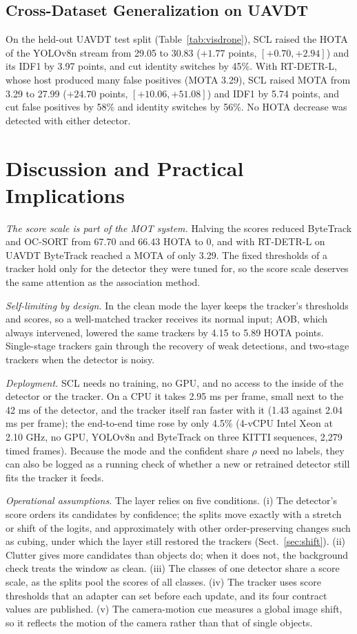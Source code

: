 \documentclass[pdflatex,sn-mathphys-num,iicol]{sn-jnl}
\newcommand{\scl}{SCL}
\newcommand{\aob}{AOB}
\begin{document}
\subsection{Cross-Dataset Generalization on UAVDT}\label{sec:visdrone}
On the held-out UAVDT test split (Table~\ref{tab:visdrone}), \scl{} raised the HOTA of the YOLOv8n
stream from 29.05 to 30.83 ($+1.77$ points, $[+0.70,+2.94]$) and its IDF1 by 3.97 points, and cut identity switches by
45\%. With RT-DETR-L, whose host produced many false positives (MOTA 3.29), \scl{} raised MOTA from 3.29
to 27.99 ($+24.70$ points, $[+10.06,+51.08]$) and IDF1 by 5.74 points, and cut false positives by 58\% and
identity switches by 56\%. No HOTA decrease was detected with either detector.
\section{Discussion and Practical Implications}\label{sec:discussion}

\emph{The score scale is part of the MOT system.} Halving the scores reduced ByteTrack and OC-SORT
from 67.70 and 66.43 HOTA to 0, and with RT-DETR-L on UAVDT ByteTrack reached a MOTA of only 3.29.
The fixed thresholds of a tracker hold only for the detector they were tuned for, so the score
scale deserves the same attention as the association method.

\emph{Self-limiting by design.} In the clean mode the layer keeps the tracker's thresholds and
scores, so a well-matched tracker receives its normal input; \aob{}, which always intervened,
lowered the same trackers by 4.15 to 5.89 HOTA points. Single-stage trackers gain through the
recovery of weak detections, and two-stage trackers when the detector is noisy.

\emph{Deployment.} \scl{} needs no training, no GPU, and no access to the inside of the detector or
the tracker. On a CPU it takes 2.95 ms per frame, small next to the 42 ms of the detector, and the
tracker itself ran faster with it (1.43 against 2.04 ms per frame); the end-to-end time rose by
only 4.5\% (4-vCPU Intel Xeon at 2.10 GHz, no GPU, YOLOv8n and ByteTrack on three KITTI sequences,
2,279 timed frames). Because the mode and the confident share
$\rho$ need no labels, they can also be logged as a running check of whether a new or retrained
detector still fits the tracker it feeds.

\emph{Operational assumptions.} The layer relies on five conditions. (i) The detector's score
orders its candidates by confidence; the splits move exactly with a stretch or shift of the
logits, and approximately with other order-preserving changes such as cubing, under which the
layer still restored the trackers (Sect.~\ref{sec:shift}). (ii) Clutter gives more candidates
than objects do; when it does not, the background check treats the window as clean. (iii) The
classes of one detector share a score scale, as the splits pool the scores of all classes. (iv)
The tracker uses score thresholds that an adapter can set before each update, and its four
contract values are published. (v) The camera-motion cue measures a global image shift, so it
reflects the motion of the camera rather than that of single objects.
\end{document}
